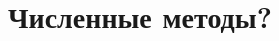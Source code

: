 \section{Численные методы?}
\begin{comment}

\label{sec:ch1/secx/numeric-tests}

\subsection{Radiation reaction: classical limit}

In order to test the Vay's solver for the equations of motion~\cite{Vay08} coupled with
Landau--Lifshitz radiation
reaction force (taken into account by Euler method) let us
consider electron motion in constant crossed electric and magnetic fields:
\begin{eqnarray}
    \label{crossed_fields1}
    E_y = a_0 / 2, \quad B_z = a_0, \\
    \label{crossed_fields2}
    E_x = E_z = B_x = B_y = 0.
\end{eqnarray}


\end{comment}
